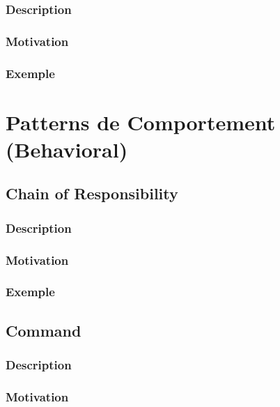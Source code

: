 \documentclass[french]{article}
\begin{document}
\subsubsection{Description}

\subsubsection{Motivation}

\subsubsection{Exemple}




\section{Patterns de Comportement (Behavioral)}

\subsection{Chain of Responsibility}

\subsubsection{Description}

\subsubsection{Motivation}

\subsubsection{Exemple}



\subsection{Command}

\subsubsection{Description}

\subsubsection{Motivation}
\end{document}
